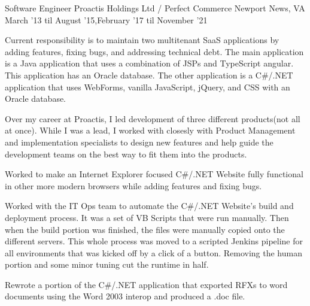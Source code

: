

\begin{cventries}

    \cventry
    {Software Engineer} %
    {Proactis Holdings Ltd / Perfect Commerce} %
    {Newport News, VA} %
    {March '13 til August '15,\newline February '17 til November '21} %
    {
        \begin{cvitems} %
        \item {Current responsibility is to maintain two multitenant SaaS applications by adding features, fixing bugs, and addressing technical debt.
            The main application is a Java application that uses a combination of JSPs and TypeScript angular. This application has an Oracle database.
            The other application is a C\#/.NET application that uses WebForms, vanilla JavaScript, jQuery, and CSS with an Oracle database.}
        \item {Over my career at Proactis, I led development of three different products(not all at once). 
            While I was a lead, I worked with closesly with Product Management and implementation specialists to design new features 
            and help guide the development teams on the best way to fit them into the products.}
        \item {Worked to make an Internet Explorer focused C\#/.NET Website fully functional in other more modern browsers while adding features and fixing bugs.}
        \item {Worked with the IT Ops team to automate the C\#/.NET Website's build and deployment process.
            It was a set of VB Scripts that were run manually. Then when the build portion was finished, the files were manually copied onto the different servers.
            This whole process was moved to a scripted Jenkins pipeline for all environments that was kicked off by a click of a button. 
            Removing the human portion and some minor tuning cut the runtime in half.}
        \item {Rewrote a portion of the C\#/.NET application that exported RFXs to word documents using the Word 2003 interop and produced a .doc file. 
}
\end{cvitems}}
\end{cventries}
